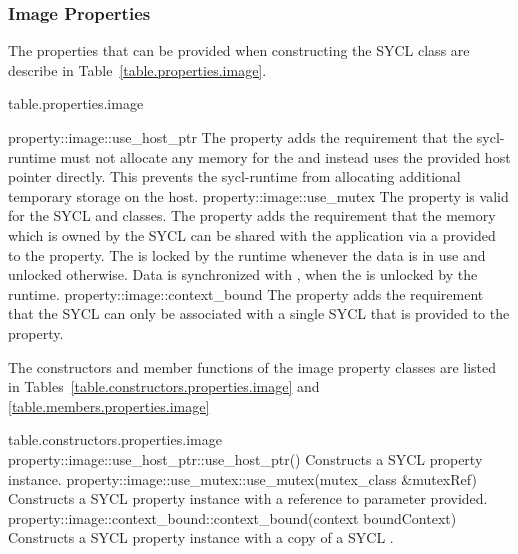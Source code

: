 \subsubsection{Image Properties}
\label{sec:image-properties}

The properties that can be provided when constructing the SYCL  class are describe in Table~\ref{table.properties.image}.

 {table.properties.image}

\addRow
  { property::image::use_host_ptr }
  {
    The  property adds the requirement that the \gls{sycl-runtime} must not allocate any memory for the  and instead uses the provided host pointer directly. This prevents the \gls{sycl-runtime} from allocating additional temporary storage on the host.
  }
\addRow
  { property::image::use_mutex }
  {
    The  property is valid for the SYCL  and  classes. The property adds the requirement that the memory which is owned by the SYCL  can be shared with the application via a  provided to the property. The   is locked by the runtime whenever the data is in use and unlocked otherwise. Data is synchronized with , when the  is unlocked by the runtime.
  }
\addRow
  { property::image::context_bound }
  {
    The  property adds the requirement that the SYCL  can only be associated with a single SYCL  that is provided to the property.
  }
\completeTable

The constructors and member functions of the image property classes
are listed in Tables~\ref{table.constructors.properties.image} and
\ref{table.members.properties.image}

{table.constructors.properties.image}
\addRow
{property::image::use_host_ptr::use_host_ptr()}
{
  Constructs a SYCL  property instance.
}
\addRow
{property::image::use_mutex::use_mutex(mutex_class \&mutexRef)}
{
  Constructs a SYCL  property instance with a reference to  parameter provided.
}
\addRow
{property::image::context_bound::context_bound(context boundContext)}
{
  Constructs a SYCL  property instance with a copy of a SYCL .
}
\completeTable

